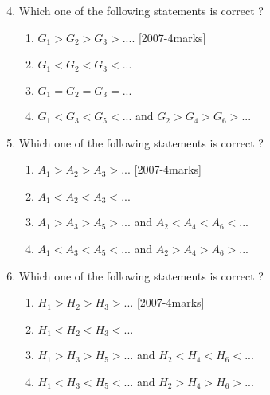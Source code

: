 \documentclass[journal,12pt,twocolumn]{IEEEtran}
\theoremstyle{remark}
\begin{document}
  \begin{enumerate}
  \setcounter{enumi}{3}    
  
 \item Which one of the following statements  is    correct ?
\begin{enumerate}

 
  \item$G_{1}>G_{2}>G_{3}>....$ \hfill[2007-4marks]

 \item$G_{1}<G_{2}<G_{3}<...$

\item$G_{1}=G_{2}=G_{3}=...$

\item$G_{1}<G_{3}<G_{5}<...$ and $G_{2}>G_{4}>G_{6}>...$
\end{enumerate}

\item Which one of the following statements is correct ?
\begin{enumerate}
    
\item $A_{1}>A_{2}>A_{3}>...$ \hfill[2007-4marks]

\item $A_{1}<A_{2}<A_{3}<...$

\item $A_{1}>A_{3}>A_{5}>...$ and $A_{2}<A_{4}<A_{6}<...$

\item $A_{1}<A_{3}<A_{5}<...$ and $A_{2}>A_{4}>A_{6}>...$
\end{enumerate}

\item Which one of the following statements is correct ?
\begin{enumerate}

 \item $H_{1}>H_{2}>H_{3}>...$ \hfill[2007-4marks]

 \item $H_{1}<H_{2}<H_{3}<...$

\item $H_{1}>H_{3}>H_{5}>...$ and $H_{2}<H_{4}<H_{6}<...$

\item $H_{1}<H_{3}<H_{5}<...$ and $H_{2}>H_{4}>H_{6}>...$
\end{enumerate}
\end{enumerate}
\end{document}
